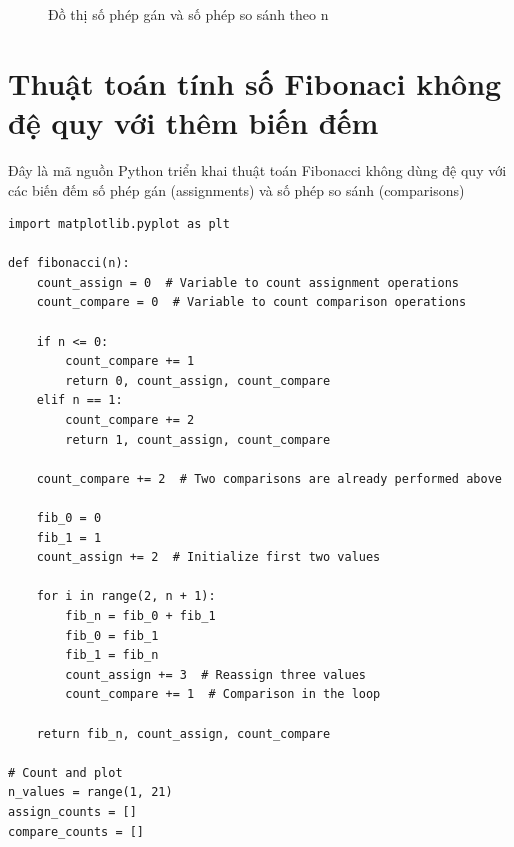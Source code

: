 \documentclass[12pt,a4paper]{article}
\begin{document}
\begin{enumerate}[label=\textbf{Câu 2:} ]
\begin{enumerate}[label=\textbf{Câu 3:} ]
\begin{enumerate}[label=\alph*)]
\begin{itemize}
\begin{figure}[h!]
    \centering
    \caption{Đồ thị số phép gán và số phép so sánh theo n}
\end{figure}
\end{itemize}

\section*{\textbf{Thuật toán tính số Fibonaci không đệ quy với thêm biến đếm}}
                                    Đây là mã nguồn Python triển khai thuật toán Fibonacci không dùng đệ quy với các biến đếm số phép gán (assignments) và số phép so sánh (comparisons)
                        \\
                             \begin{lstlisting}
import matplotlib.pyplot as plt

def fibonacci(n):
    count_assign = 0  # Variable to count assignment operations
    count_compare = 0  # Variable to count comparison operations

    if n <= 0:
        count_compare += 1
        return 0, count_assign, count_compare
    elif n == 1:
        count_compare += 2
        return 1, count_assign, count_compare
    
    count_compare += 2  # Two comparisons are already performed above

    fib_0 = 0
    fib_1 = 1
    count_assign += 2  # Initialize first two values

    for i in range(2, n + 1):
        fib_n = fib_0 + fib_1
        fib_0 = fib_1
        fib_1 = fib_n
        count_assign += 3  # Reassign three values
        count_compare += 1  # Comparison in the loop

    return fib_n, count_assign, count_compare

# Count and plot
n_values = range(1, 21)
assign_counts = []
compare_counts = []


\end{lstlisting}
\end{enumerate}
\end{enumerate}
\end{enumerate}
\end{document}
